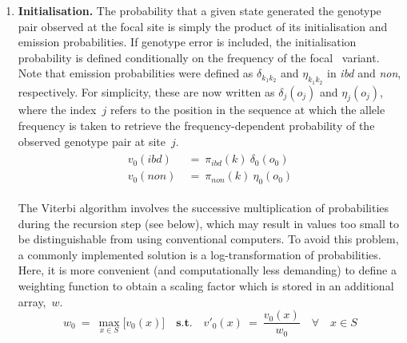 \begin{enumerate}[label=\textbf{\arabic*.}]
	\item \textbf{Initialisation.} %
	The probability that a given state generated the genotype pair observed at the focal site is simply the product of its initialisation and emission probabilities.
	If genotype error is included, the initialisation probability is defined conditionally on the frequency of the focal \fk{}~variant.
	Note that emission probabilities were defined as ${\delta_{k_1 k_2}}$ and ${\eta_{k_1 k_2}}$ in \emph{ibd} and \emph{non}, respectively.
	For simplicity, these are now written as ${\delta_j(o_j)}$ and ${\eta_j(o_j)}$, where the index~$j$ refers to the position in the sequence at which the allele frequency is taken to retrieve the frequency-dependent probability of the observed genotype pair at site~$j$.
	\begin{align}
	\begin{aligned}
		v_0(\textit{ibd}) & ~=~ \pi_\textit{ibd}(k) ~ \delta_0(o_0) \\
		v_0(\textit{non}) & ~=~ \pi_\textit{non}(k) ~ \eta_0(o_0)
	\end{aligned}
	\end{align}

	The Viterbi algorithm involves the successive multiplication of probabilities during the recursion step (see below), which may result in values too small to be distinguishable from  using conventional computers.
	To avoid this problem, a commonly implemented solution is a log-transformation of probabilities.
	Here, it is more convenient (and computationally less demanding) to define a weighting function to obtain a scaling factor which is stored in an additional array,~$w$.
	\begin{equation}
		w_0 ~=~ \max_{x \in S} \big[ v_0(x) \big] \quad\textbf{s.t.}\quad
		v'_0(x) ~=~ \frac{v_0(x)}{w_0} \quad \forall \quad x \in S
	\end{equation}


\end{enumerate}
